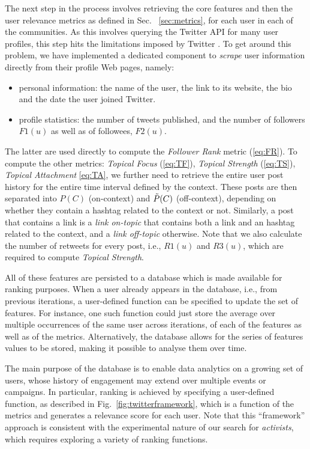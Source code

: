 The next step in the process involves retrieving the core features and then the user relevance metrics as defined in Sec. ~\ref{sec:metrics}, for each user in each of the communities.
%
As this involves querying the Twitter API for many user profiles, this step hits the limitations imposed by Twitter .
To get around this problem, we have implemented a dedicated component to \textit{scrape} user information directly from their profile Web pages, namely:
\begin{itemize}
	\item personal information: the name of the user, the link to its website, the bio and the date the user joined Twitter.
	\item profile statistics: the number of tweets published, and the number of followers $F1(u)$ as well as of followees, $F2(u)$.
\end{itemize}
The latter are used directly to compute  the \textit{Follower Rank} metric (\ref{eq:FR}).
To compute the other metrics: \textit{Topical Focus} (\ref{eq:TF}), \textit{Topical Strength} (\ref{eq:TS}), \textit{Topical Attachment} \ref{eq:TA}, we further need to retrieve the entire user post history for the entire time interval defined by the context.
These posts are then separated into $P(C)$ (on-context) and $\Tilde{P}(C)$ (off-context), depending on whether they contain a hashtag related to the context or not.
Similarly, a post that contains a link is a \textit{link on-topic} that contains both a link and an hashtag related to the context, and a \textit{link off-topic} otherwise.
Note that we also calculate the number of retweets for every post, i.e., $\mathit{R1}(u)$ and $\mathit{R3}(u)$, which are required to compute \textit{Topical Strength}.

All of these features are persisted to a database which is made available for ranking purposes.
When a user already appears in the database, i.e., from previous iterations, a user-defined function can be specified to update the set of features. 
For instance, one such function could just store the average over multiple occurrences of the same user across iterations, of each of the features as well as of the metrics.
Alternatively, the database allows for the series of features values to be stored, making it possible to analyse them over time.

The main purpose of the database is to enable data analytics on a growing set of users, whose history of engagement may extend over multiple events or campaigns.
In particular, ranking is achieved by specifying a user-defined function, as described in Fig.~\ref{fig:twitterframework}, which is a function of the metrics and generates a relevance score for each user.
Note that this ``framework'' approach is consistent with the experimental nature of our search for \textit{activists}, which requires exploring a variety of ranking functions.

